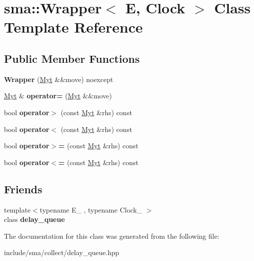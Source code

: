 \hypertarget{classsma_1_1Wrapper}{\section{sma\-:\-:Wrapper$<$ E, Clock $>$ Class Template Reference}
\label{classsma_1_1Wrapper}
}
\subsection*{Public Member Functions}
\begin{DoxyCompactItemize}
\item 
\hypertarget{classsma_1_1Wrapper_abead9d062ccc8208999f6d2d64d1b12f}{{\bfseries Wrapper} (\hyperlink{classsma_1_1Wrapper}{Myt} \&\&move) noexcept}\label{classsma_1_1Wrapper_abead9d062ccc8208999f6d2d64d1b12f}

\item 
\hypertarget{classsma_1_1Wrapper_aee56f944c28e446cfb2b4948580f1eb0}{\hyperlink{classsma_1_1Wrapper}{Myt} \& {\bfseries operator=} (\hyperlink{classsma_1_1Wrapper}{Myt} \&\&move)}\label{classsma_1_1Wrapper_aee56f944c28e446cfb2b4948580f1eb0}

\item 
\hypertarget{classsma_1_1Wrapper_abc66d82394fdb34d5607891256f05358}{bool {\bfseries operator$>$} (const \hyperlink{classsma_1_1Wrapper}{Myt} \&rhs) const }\label{classsma_1_1Wrapper_abc66d82394fdb34d5607891256f05358}

\item 
\hypertarget{classsma_1_1Wrapper_a21a56a5db0eadf4f6ba75b40e8cd29b6}{bool {\bfseries operator$<$} (const \hyperlink{classsma_1_1Wrapper}{Myt} \&rhs) const }\label{classsma_1_1Wrapper_a21a56a5db0eadf4f6ba75b40e8cd29b6}

\item 
\hypertarget{classsma_1_1Wrapper_a4d577de4778cf3ff7ee8ccce901da9b3}{bool {\bfseries operator$>$=} (const \hyperlink{classsma_1_1Wrapper}{Myt} \&rhs) const }\label{classsma_1_1Wrapper_a4d577de4778cf3ff7ee8ccce901da9b3}

\item 
\hypertarget{classsma_1_1Wrapper_aae435be21961e534a35b2f9f4ece96c1}{bool {\bfseries operator$<$=} (const \hyperlink{classsma_1_1Wrapper}{Myt} \&rhs) const }\label{classsma_1_1Wrapper_aae435be21961e534a35b2f9f4ece96c1}

\end{DoxyCompactItemize}
\subsection*{Friends}
\begin{DoxyCompactItemize}
\item 
\hypertarget{classsma_1_1Wrapper_afe40b1848cdad9414ac7e38413f12af7}{{\footnotesize template$<$typename E\-\_\- , typename Clock\-\_\- $>$ }\\class {\bfseries delay\-\_\-queue}}\label{classsma_1_1Wrapper_afe40b1848cdad9414ac7e38413f12af7}

\end{DoxyCompactItemize}


The documentation for this class was generated from the following file\-:\begin{DoxyCompactItemize}
\item 
include/sma/collect/delay\-\_\-queue.\-hpp\end{DoxyCompactItemize}
